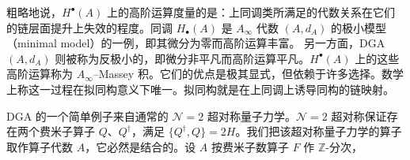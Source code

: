 粗略地说，$H^\bullet(A)$ 上的高阶运算度量的是：上同调类所满足的代数关系在它们的链层面提升上失效的程度。同调 $H_\bullet(A)$ 是 $A_\infty$ 代数 $(A,d_A)$ 的极小模型（minimal model）的一例，即其微分为零而高阶运算丰富。
另一方面，DGA $(A,d_A)$ 则被称为反极小的，即微分非平凡而高阶运算平凡。$H^\bullet(A)$ 上的这些高阶运算称为 $A_\infty$–Massey 积。它们的优点是极其显式，但依赖于许多选择。数学上称这一过程在拟同构意义下唯一。拟同构就是在上同调上诱导同构的链映射。

DGA 的一个简单例子来自通常的 $\mathcal{N}=2$ 超对称量子力学。$\mathcal{N}=2$ 超对称保证存在两个费米子算子 $Q$、$Q^\dagger$，满足 $\{Q^\dagger,Q\}=2H$。我们把该超对称量子力学的算子取作算子代数 $A$，它必然是结合的。设 $A$ 按费米子数算子 $F$ 作 $\mathbb{Z}$-分次，
